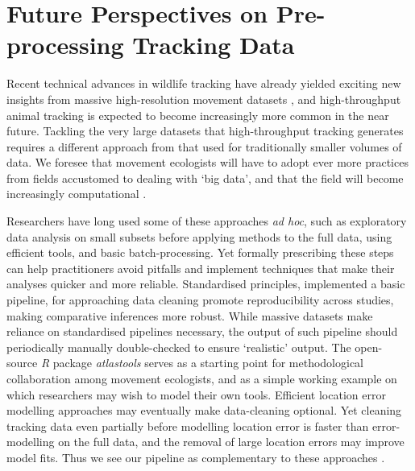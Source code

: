     \section*{Future Perspectives on Pre-processing Tracking Data}

    Recent technical advances in wildlife tracking have already yielded exciting new insights from massive high-resolution movement datasets \citep{aspillaga2021, aspillaga2021a, baktoft2017, baktoft2019, harel2016, harel2018, oudman2018, papageorgiou2019, tsoar2011, strandburg-peshkin2015, toledo2020, beardsworth2021a, beardsworth2021b, corl2020, vilk2021, lourie2021}, and high-throughput animal tracking is expected to become increasingly more common in the near future.
    Tackling the very large datasets that high-throughput tracking generates requires a different approach from that used for traditionally smaller volumes of data.
    We foresee that movement ecologists will have to adopt ever more practices from fields accustomed to dealing with `big data', and that the field will become increasingly computational \citep{peng2011}.

    Researchers have long used some of these approaches \textit{ad hoc}, such as exploratory data analysis on small subsets before applying methods to the full data, using efficient tools, and basic batch-processing. 
    Yet formally prescribing these steps can help practitioners avoid pitfalls and implement techniques that make their analyses quicker and more reliable.
    Standardised principles, implemented a basic pipeline, for approaching data cleaning promote reproducibility across studies, making comparative inferences more robust.
    While massive datasets make reliance on standardised pipelines necessary, the output of such pipeline should periodically manually double-checked to ensure `realistic' output.
    The open-source \textit{R} package \textit{atlastools} serves as a starting point for methodological collaboration among movement ecologists, and as a simple working example on which researchers may wish to model their own tools.
    Efficient location error modelling approaches \citep{fleming2020, aspillaga2021} may eventually make data-cleaning optional.
    Yet cleaning tracking data even partially before modelling location error is faster than error-modelling on the full data, and the removal of large location errors may improve model fits.
    Thus we see our pipeline as complementary to these approaches \citep{fleming2014, fleming2020}.

